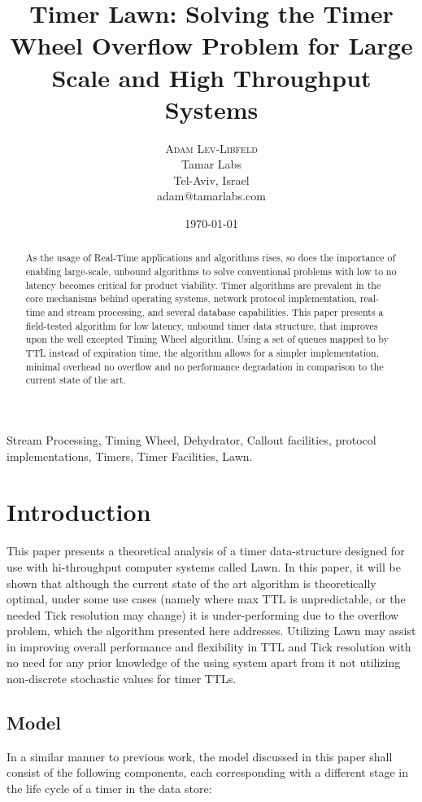 \documentclass[conference]{IEEEtran}
\title{Timer Lawn: Solving the Timer Wheel Overflow Problem for Large Scale and High Throughput Systems}
\author{
	\textsc{Adam Lev-Libfeld} \\[1ex]
	\normalsize Tamar Labs \\
	\normalsize Tel-Aviv, Israel \\
	\normalsize{adam@tamarlabs.com}
}
\date{\today}
\begin{document}
\maketitle

\begin{abstract}
As the usage of Real-Time applications and algorithms rises, so does the importance of enabling large-scale, unbound algorithms to solve conventional problems with low to no latency becomes critical for product viability\cite{REND, WHT}. Timer algorithms are prevalent in the core mechanisms behind operating systems\cite{BSD}, network protocol implementation, real-time and stream processing, and several database capabilities. This paper presents a field-tested algorithm for low latency, unbound timer data structure, that improves upon the well excepted Timing Wheel algorithm. Using a set of queues mapped to by TTL instead of expiration time, the algorithm allows for a simpler implementation, minimal overhead no overflow and no performance degradation in comparison to the current state of the art.
\end{abstract}

\begin{IEEEkeywords}
Stream Processing, Timing Wheel, Dehydrator, Callout facilities, protocol implementations, Timers, Timer Facilities, Lawn.
\end{IEEEkeywords}

\section{Introduction}
This paper presents a theoretical analysis of a timer data-structure designed for use with hi-throughput computer systems called Lawn. In this paper, it will be shown that although the current state of the art algorithm is theoretically optimal, under some use cases (namely where max TTL is unpredictable, or the needed Tick resolution may change) it is under-performing due to the overflow problem, which the algorithm presented here addresses. Utilizing Lawn may assist in improving overall performance and flexibility in TTL and Tick resolution with no need for any prior knowledge of the using system apart from it not utilizing non-discrete stochastic values for timer TTLs.
\subsection{Model}
In a similar manner to previous work\cite{TW, CQ, EMP}, the model discussed in this paper shall consist of the following components, each corresponding with a different stage in the life cycle of a timer in the data store:
\end{document}
